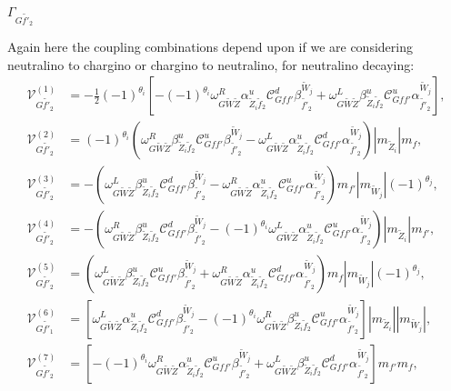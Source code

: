 \documentclass[final,3p,times,pdflatex]{elsarticle}
\begin{document}
\textbf{\underline{$\Gamma_{G \tilde{f'}_2}$}}

Again here the coupling combinations depend upon if we are considering neutralino to chargino or chargino to neutralino, for neutralino decaying:
\begin{align}
\mathcal{V}_{G \tilde{f'}_2}^{(1)} &= -\frac{1}{2}(-1)^{\theta_i}[-(-1)^{\theta_i} \omega_{G \tilde{W} \tilde{Z}}^R \alpha_{\tilde{Z}_i \tilde{f}_2}^{u} \mathcal{C}_{G f f'}^d \beta_{\tilde{f'}_2}^{\tilde{W}_j}  + \omega_{G \tilde{W} \tilde{Z}}^L \beta_{\tilde{Z}_i \tilde{f}_2}^{u} \mathcal{C}_{G f f'}^u  \alpha_{\tilde{f'}_2}^{\tilde{W}_j}], \\
\mathcal{V}_{G \tilde{f'}_2}^{(2)} &= (-1)^{\theta_i}(\omega_{G \tilde{W} \tilde{Z}}^R \beta_{\tilde{Z}_i \tilde{f}_2}^{u}  \mathcal{C}_{G f f'}^u \beta_{\tilde{f'}_2}^{\tilde{W}_j} - \omega_{G \tilde{W} \tilde{Z}}^L \alpha_{\tilde{Z}_i \tilde{f}_2}^{u} \mathcal{C}_{G f f'}^d \alpha_{\tilde{f'}_2}^{\tilde{W}_j})|m_{\tilde{Z}_i}|m_{f}, \\
\mathcal{V}_{G \tilde{f'}_2}^{(3)} &= -(\omega_{G \tilde{W} \tilde{Z}}^L \beta_{\tilde{Z}_i \tilde{f}_2}^{u} \mathcal{C}_{G f f'}^d \beta_{\tilde{f'}_2}^{\tilde{W}_j} - \omega_{G \tilde{W} \tilde{Z}}^R \alpha_{\tilde{Z}_i \tilde{f}_2}^{u} \mathcal{C}_{G f f'}^u \alpha_{\tilde{f'}_2}^{\tilde{W}_j})m_{f'}|m_{\tilde{W}_j}|(-1)^{\theta_j}, \\
\mathcal{V}_{G \tilde{f'}_2}^{(4)} &= -(\omega_{G \tilde{W} \tilde{Z}}^R \beta_{\tilde{Z}_i \tilde{f}_2}^{u} \mathcal{C}_{G f f'}^d \beta_{\tilde{f'}_2}^{\tilde{W}_j} - (-1)^{\theta_i} \omega_{G \tilde{W} \tilde{Z}}^L \alpha_{\tilde{Z}_i \tilde{f}_2}^{u} \mathcal{C}_{G f f'}^u \alpha_{\tilde{f'}_2}^{\tilde{W}_j})|m_{\tilde{Z}_i}|m_{f'}, \\
\mathcal{V}_{G \tilde{f'}_2}^{(5)} &= (\omega_{G \tilde{W} \tilde{Z}}^L \beta_{\tilde{Z}_i \tilde{f}_2}^{u} \mathcal{C}_{G f f'}^u \beta_{\tilde{f'}_2}^{\tilde{W}_j} + \omega_{G \tilde{W} \tilde{Z}}^R \alpha_{\tilde{Z}_i \tilde{f}_2}^{u} \mathcal{C}_{G f f'}^d \alpha_{\tilde{f'}_2}^{\tilde{W}_j})m_{f}|m_{\tilde{W}_j}|(-1)^{\theta_j}, \\
\mathcal{V}_{G \tilde{f'}_1}^{(6)} &= [\omega_{G \tilde{W} \tilde{Z}}^L \alpha_{\tilde{Z}_i \tilde{f}_2}^{u} \mathcal{C}_{G f f'}^d \beta_{\tilde{f'}_2}^{\tilde{W}_j} - (-1)^{\theta_i} \omega_{G \tilde{W} \tilde{Z}}^R \beta_{\tilde{Z}_i \tilde{f}_2}^{u} \mathcal{C}_{G f f'}^u \alpha_{\tilde{f'}_2}^{\tilde{W}_j}]|m_{\tilde{Z}_i}||m_{\tilde{W}_j}|, \\
\mathcal{V}_{G \tilde{f'}_2}^{(7)} &= [-(-1)^{\theta_i} \omega_{G \tilde{W} \tilde{Z}}^R \alpha_{\tilde{Z}_i \tilde{f}_2}^{u} \mathcal{C}_{G f f'}^u \beta_{\tilde{f'}_2}^{\tilde{W}_j} + \omega_{G \tilde{W} \tilde{Z}}^L \beta_{\tilde{Z}_i \tilde{f}_2}^{u} \mathcal{C}_{G f f'}^d \alpha_{\tilde{f'}_2}^{\tilde{W}_j}]m_{f'}m_{f}, \\

\end{align}
\end{document}
